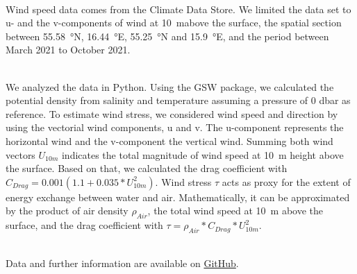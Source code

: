 \documentclass[../Main.tex]{subfiles}
\begin{document}
\\
Wind speed data comes from the Climate Data Store\supercite{era}. 
We limited the data set to u- and the v-components of wind at \SI{10}{m}above the surface, the spatial section between \SI{55.58}{\degree}N, \SI{16.44}{\degree}E, \SI{55.25}{\degree}N and \SI{15.9}{\degree}E, and the period between March 2021 to October 2021.

\\
We analyzed the data in Python. Using the GSW package, we calculated the potential density from salinity and temperature assuming a pressure of 0 dbar as reference\supercite{gsw}. 
To estimate wind stress, we considered wind speed and direction by using the vectorial wind components, u and v.
The u-component represents the horizontal wind and the v-component the vertical wind. 
Summing both wind vectors $U_{10m}$ indicates the total magnitude of wind speed at \SI{10}{m} height above the surface. Based on that, we calculated the drag coefficient with $C_{Drag} = 0.001(1.1+0.035*U_{10m}^2)$. 
Wind stress $\tau$ acts as proxy for the extent of energy exchange between water and air.
Mathematically, it can be approximated by the product of air density $\rho_{Air}$, the total wind speed at \SI{10}{m} above the surface, and the drag coefficient with $\tau = \rho_{Air}*C_{Drag}*U_{10m}^2$\supercite{Mehrfar2018}.

\\
Data and further information are available on \href{https://github.com/joaldi2208/BloomDynamics}{GitHub}.
\end{document}
